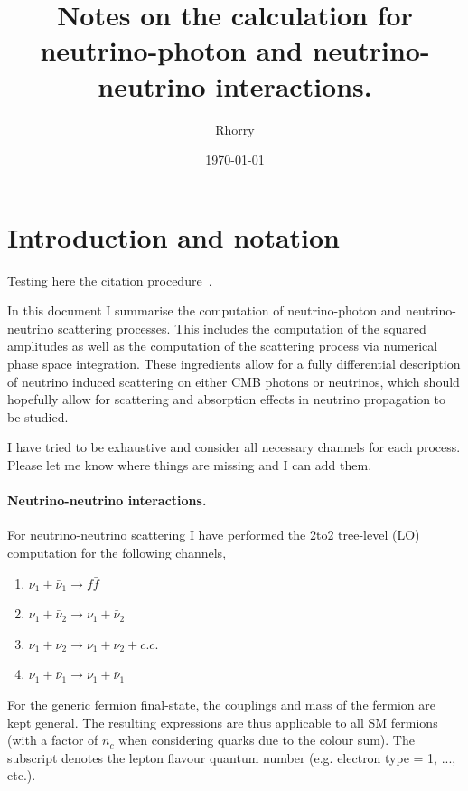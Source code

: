 \documentclass[a4paper,11pt]{article}
\begin{document}
\title{Notes on the calculation for neutrino-photon and neutrino-neutrino interactions.}

\author[1]{Rhorry}

\date{\today}


\maketitle
\flushbottom

\section{Introduction and notation}
Testing here the citation procedure~\cite{Gauld:2021zmq}.

In this document I summarise the computation of neutrino-photon and neutrino-neutrino scattering processes. This includes the computation of the squared amplitudes as well as the computation of the scattering process via numerical phase space integration.
%
These ingredients allow for a fully differential description of neutrino induced scattering on either CMB photons or neutrinos, which should hopefully allow for scattering and absorption effects in neutrino propagation to be studied.

I have tried to be exhaustive and consider all necessary channels for each process. Please let me know where things are missing and I can add them.

\paragraph{Neutrino-neutrino interactions.} For neutrino-neutrino scattering I have performed the 2to2 tree-level (LO) computation for the following channels,
\begin{enumerate}
	\item $\nu_1 + \bar{\nu}_1 \to f \bar f$
	\item $\nu_1 + \bar{\nu}_2 \to \nu_1 + \bar{\nu}_2$
	\item $\nu_1 + \nu_2 \to\nu_1 + \nu_2 + c.c.$
	\item $\nu_1 + \bar{\nu}_1 \to \nu_1 + \bar{\nu}_1$
\end{enumerate}
For the generic fermion final-state, the couplings and mass of the fermion are kept general. The resulting expressions are thus applicable to all SM fermions (with a factor of $n_c$ when considering quarks due to the colour sum). The subscript denotes the lepton flavour quantum number (e.g. electron type = 1, ..., etc.).
\end{document}
